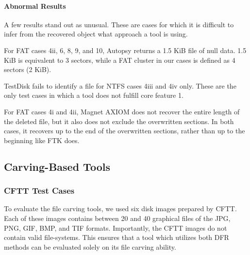 \begin{paraphrase}
\paragraph{Abnormal Results}
A few results stand out as unusual.
These are cases for which it is difficult to infer from the recovered object what approach a tool is using.

For FAT cases 4ii, 6, 8, 9, and 10, Autopsy returns a 1.5 KiB file of null data.
1.5 KiB is equivalent to 3 sectors, while a FAT cluster in our cases is defined as 4 sectors (2 KiB).

TestDisk fails to identify a file for NTFS cases 4iii and 4iv only. 
These are the only test cases in which a tool does not fulfill core feature 1.

For FAT cases 4i and 4ii, Magnet AXIOM does not recover the entire length of the deleted file, but it also does not exclude the overwritten sections. 
In both cases, it recovers up to the end of the overwritten sections, rather than up to the beginning like FTK does.
\end{paraphrase}




\subsection{Carving-Based Tools}

\subsubsection{CFTT Test Cases}
To evaluate the file carving tools, we used six disk images prepared by CFTT\cite{cftt_carving_images}.
Each of these images contains between 20 and 40 graphical files of the JPG, PNG, GIF, BMP, and TIF formats.
Importantly, the CFTT images do not contain valid file-systems.
This ensures that a tool which utilizes both DFR methods can be evaluated solely on its file carving ability.

